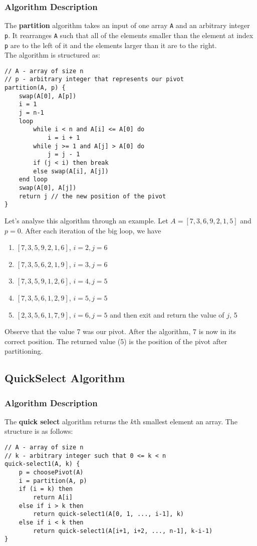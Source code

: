 \documentclass{report}
\begin{document}
\subsubsection{Algorithm Description}
The \textbf{partition} algorithm takes an input of one array \texttt{A} and an arbitrary integer \texttt{p}. It rearranges \texttt{A} such that all of the elements smaller than the element at index \texttt{p} are to the left of it and the elements larger than it are to the right.\\
The algorithm is structured as: 
\begin{lstlisting}
// A - array of size n
// p - arbitrary integer that represents our pivot
partition(A, p) {
	swap(A[0], A[p])
	i = 1
	j = n-1
	loop
		while i < n and A[i] <= A[0] do
			i = i + 1
		while j >= 1 and A[j] > A[0] do
			j = j - 1
		if (j < i) then break
		else swap(A[i], A[j])
	end loop
	swap(A[0], A[j])
	return j // the new position of the pivot
}
\end{lstlisting}
Let's analyse this algorithm through an example. Let $A = [7, 3, 6, 9, 2, 1, 5]$ and $p=0$. After each iteration of the big loop, we have
\begin{enumerate}
\item $[7, 3, 5, 9, 2, 1, 6]$, $i = 2, j = 6$
\item $[7, 3, 5, 6, 2, 1, 9]$, $i = 3, j = 6$
\item $[7, 3, 5, 9, 1, 2, 6]$, $i = 4, j = 5$
\item $[7, 3, 5, 6, 1, 2, 9]$, $i = 5, j = 5$
\item $[2, 3, 5, 6, 1, 7, 9]$, $i = 6, j = 5$ and then exit and return the value of $j$, 5
\end{enumerate}
Observe that the value 7 was our pivot. After the algorithm, 7 is now in its correct position.
The returned value (5) is the position of the pivot after partitioning.
\subsection{QuickSelect Algorithm}
\subsubsection{Algorithm Description}
The \textbf{quick select} algorithm returns the $k$th smallest element an array. The structure is as follows:
\begin{lstlisting}
// A - array of size n
// k - arbitrary integer such that 0 <= k < n
quick-select1(A, k) {
	p = choosePivot(A)
	i = partition(A, p)
	if (i = k) then
		return A[i]
	else if i > k then
		return quick-select1(A[0, 1, ..., i-1], k)
	else if i < k then
		return quick-select1(A[i+1, i+2, ..., n-1], k-i-1)
}
\end{lstlisting}
\end{document}
